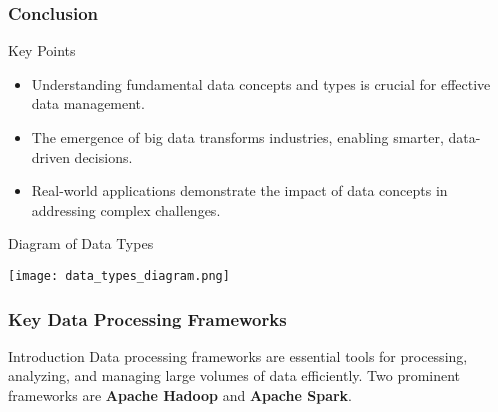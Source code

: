 \documentclass{beamer}
\begin{document}
\begin{frame}[fragile]
    \frametitle{Conclusion}
    \begin{block}{Key Points}
        \begin{itemize}
            \item Understanding fundamental data concepts and types is crucial for effective data management.
            \item The emergence of big data transforms industries, enabling smarter, data-driven decisions.
            \item Real-world applications demonstrate the impact of data concepts in addressing complex challenges.
        \end{itemize}
    \end{block}

    \begin{block}{Diagram of Data Types}
        \begin{center}
            \texttt{[image: data\_types\_diagram.png]} %
        \end{center}
    \end{block}
\end{frame}

\begin{frame}[fragile]
    \frametitle{Key Data Processing Frameworks}
    \begin{block}{Introduction}
        Data processing frameworks are essential tools for processing, analyzing, and managing large volumes of data efficiently. Two prominent frameworks are \textbf{Apache Hadoop} and \textbf{Apache Spark}.
    \end{block}
\end{frame}
\end{document}
